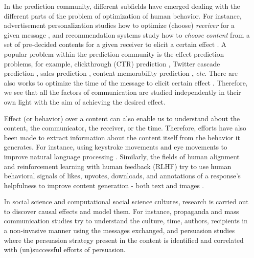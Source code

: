 \documentclass[PhD]{iiitd}
\renewcommand{\cite}[1]{\citep{#1}}
\begin{document}
In the prediction community, different subfields have emerged dealing with the different parts of the problem of optimization of human behavior. For instance, advertisement personalization studies how to optimize (choose) \textit{receiver} for a given message \cite{chandra2022personalization}, and recommendation systems study how to \textit{choose content} from a set of pre-decided contents for a given receiver to elicit a certain effect \cite{herlocker2004evaluating}. A popular problem within the prediction community is the effect prediction problems, for example, clickthrough (CTR) prediction \cite{mcmahan2013ad}, Twitter cascade prediction \cite{cheng2014can,martin2016exploring}, sales prediction \cite{choi2012predicting,pryzant2017predicting}, content memorability prediction \cite{isola2011makes,khosla2015understanding,si2023long}, \textit{etc}. There are also works to optimize the time of the message to elicit certain effect \cite{newstead2010cost,si2023long}. Therefore, we see that all the factors of communication are studied independently in their own light with the aim of achieving the desired effect. 


Effect (or behavior) over a content can also enable us to understand about the content, the communicator, the receiver, or the time. Therefore, efforts have also been made to extract information about the content itself from the behavior it generates. For instance, using keystroke movements \cite{plank2016keystroke} and eye movements to improve natural language processing \cite{klerke2016improving,khurana-etal-2023-synthesizing}. Similarly, the fields of human alignment and reinforcement learning with human feedback (RLHF) try to use human behavioral signals of likes, upvotes, downloads, and annotations of a response's helpfulness to improve content generation - both text \cite{kreutzer2018can,stiennon2020learning,ziegler2019fine,nakano2021webgpt,si2023long} and images \cite{lee2023aligning,pressman2023simulacra,wu2023better,khurana2023behavior}.




In social science and computational social science cultures, research is carried out to discover causal effects and model them. 
For instance, propaganda and mass communication studies \cite{mcquail1987mass,krippendorff2018content,lasswell1948structure,lasswell1971propaganda} try to understand the culture, time, authors, recipients in a non-invasive manner using the messages exchanged, and persuasion studies \cite{petty1981effects,chaiken1980heuristic} where the persuasion strategy present in the content is identified and correlated with (un)successful efforts of persuasion. 
\end{document}
